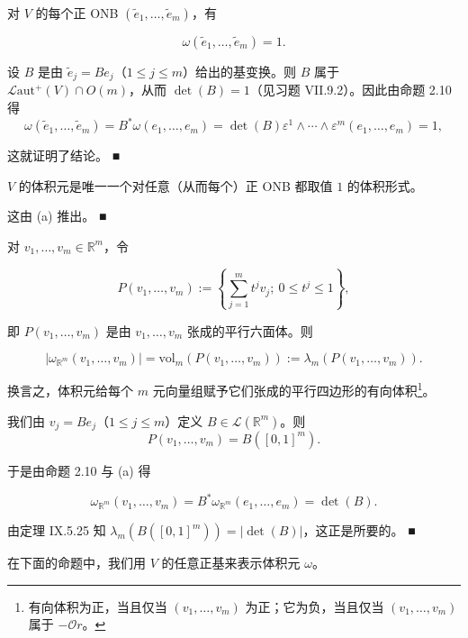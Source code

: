 \begin{remark}

\begin{items}
\item

对 $ V $ 的每个正 ONB $ (\widetilde{e}_{1},\ldots,\widetilde{e}_{m}) $，有

\[
\omega(\widetilde{e}_{1},\ldots,\widetilde{e}_{m}) = 1 .
\]

\proofhead
设 $ B $ 是由 $ \widetilde{e}_{j} = Be_{j} $（$ 1 \le j \le m $）给出的基变换。则 $ B $ 属于 $ \mathcal{L}\mathrm{aut}^{+}(V) \cap O(m) $，从而 $ \det(B) = 1 $（见习题 VII.9.2）。因此由命题 2.10 得
\[
\omega(\widetilde{e}_{1},\ldots,\widetilde{e}_{m}) = B^{*}\omega(e_{1},\ldots,e_{m}) = \det(B)\varepsilon^{1}\wedge\cdots\wedge\varepsilon^{m}(e_{1},\ldots,e_{m}) = 1 ,
\]

这就证明了结论。 \nobreak\hspace{0.35em}■

\item

$ V $ 的体积元是唯一一个对任意（从而每个）正 ONB 都取值 $ 1 $ 的体积形式。

\proofhead
这由 (a) 推出。 \nobreak\hspace{0.35em}■
\item

对 $ v_{1},\ldots,v_{m} \in \mathbb{R}^{m} $，令

\[
P(v_{1},\ldots,v_{m}) := \left\{ \sum_{j=1}^{m} t^{j}v_{j} ;\ 0 \le t^{j} \le 1 \right\} ,
\]

即 $ P(v_{1},\ldots,v_{m}) $ 是由 $ v_{1},\ldots,v_{m} $ 张成的平行六面体。则

\[
|\omega_{\mathbb{R}^{m}}(v_{1},\ldots,v_{m})| = \mathrm{vol}_{m}(P(v_{1},\ldots,v_{m})) := \lambda_{m}(P(v_{1},\ldots,v_{m})) .
\]

换言之，体积元给每个 $ m $ 元向量组赋予它们张成的平行四边形的有向体积\footnote{有向体积为正，当且仅当 $ (v_{1},\ldots,v_{m}) $ 为正；它为负，当且仅当 $ (v_{1},\ldots,v_{m}) $ 属于 $ -\mathcal{O}r $。}。

\proofhead
我们由 $ v_{j} = Be_{j} $（$ 1 \le j \le m $）定义 $ B \in \mathcal{L}(\mathbb{R}^{m}) $。则
\[
P(v_{1},\ldots,v_{m}) = B([0,1]^{m}) .
\]

于是由命题 2.10 与 (a) 得

\[
\omega_{\mathbb{R}^{m}}(v_{1},\ldots,v_{m}) = B^{*}\omega_{\mathbb{R}^{m}}(e_{1},\ldots,e_{m}) = \det(B) .
\]

由定理 IX.5.25 知 $ \lambda_{m}(B([0,1]^{m})) = |\det(B)| $，这正是所要的。 \nobreak\hspace{0.35em}■

\end{items}

在下面的命题中，我们用 $ V $ 的任意正基来表示体积元 $ \omega $。

\end{remark}

